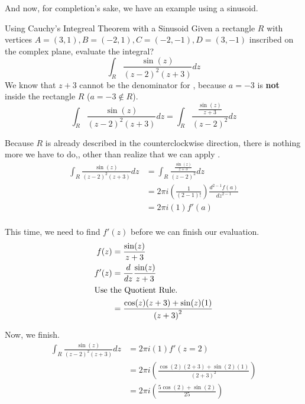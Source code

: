 And now, for completion's sake, we have an example using a sinusoid.
\begin{example}{Using Cauchy's Integreal Theorem with a Sinusoid}
  Given a rectangle $R$ with vertices $A=(3, 1), B=(-2, 1), C=(-2, -1), D=(3, -1)$ inscribed on the complex plane, evaluate the integral?
  \begin{equation*}
    \int_{R} \frac{\sin(z)}{{(z-2)}^{2} (z+3)} dz
  \end{equation*}
  \tcblower{}
  We know that $z+3$ cannot be the denominator for , because $a=-3$ is \textbf{not} inside the rectangle $R$ ($a=-3 \notin R$).
  \begin{equation*}
    \int_{R} \frac{\sin(z)}{{(z-2)}^{2} (z+3)} dz = \int_{R} \frac{\frac{\sin(z)}{z+3}}{{(z-2)}^{2}} dz
  \end{equation*}

  Because $R$ is already described in the counterclockwise direction, there is nothing more we have to do,, other than realize that we can apply .
  \begin{align*}
    \int_{R} \frac{\sin(z)}{{(z-2)}^{2} (z+3)} dz &= \int_{R} \frac{\frac{\sin(z)}{z+3}}{{(z-2)}^{2}} dz \\
                                                  &= 2 \pi i \left( \frac{1}{(2-1)!} \right) \frac{d^{2-1}f(a)}{{dz}^{2-1}} \\
                                                  &= 2 \pi i (1) f'(a) \\
  \end{align*}

  This time, we need to find $f'(z)$ before we can finish our evaluation.
  \begin{align*}
    f(z) &= \frac{\sin(z)}{z+3} \\
    f'(z) &= \frac{d}{dz} \frac{\sin(z)}{z+3} \\
    \shortintertext{Use the Quotient Rule.}
         &= \frac{\cos(z) (z+3) + \sin(z) (1)}{{(z+3)}^{2}}
  \end{align*}

  Now, we finish.
  \begin{align*}
    \int_{R} \frac{\sin(z)}{{(z-2)}^{2} (z+3)} dz &= 2 \pi i (1) f'(z=2) \\
                                                  &= 2 \pi i \left( \frac{\cos(2) (2+3) + \sin(2) (1)}{{(2+3)}^{2}} \right) \\
                                                  &= 2 \pi i \left( \frac{5 \cos(2) + \sin(2)}{25} \right)
  \end{align*}
\end{example}

